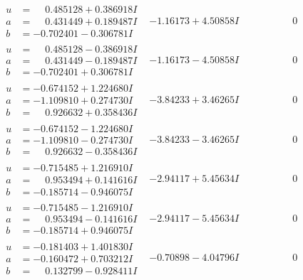 \documentclass[1p]{elsarticle_modified}
\theoremstyle{definition}
\begin{document}
$$\begin{array}{c|c|c}
\begin{aligned}
u &= \phantom{-}0.485128 + 0.386918 I \\
a &= \phantom{-}0.431449 + 0.189487 I \\
b &= -0.702401 - 0.306781 I\end{aligned}
 & -1.16173 + 4.50858 I & \phantom{-0.000000 } 0 \\ \hline\begin{aligned}
u &= \phantom{-}0.485128 - 0.386918 I \\
a &= \phantom{-}0.431449 - 0.189487 I \\
b &= -0.702401 + 0.306781 I\end{aligned}
 & -1.16173 - 4.50858 I & \phantom{-0.000000 } 0 \\ \hline\begin{aligned}
u &= -0.674152 + 1.224680 I \\
a &= -1.109810 + 0.274730 I \\
b &= \phantom{-}0.926632 + 0.358436 I\end{aligned}
 & -3.84233 + 3.46265 I & \phantom{-0.000000 } 0 \\ \hline\begin{aligned}
u &= -0.674152 - 1.224680 I \\
a &= -1.109810 - 0.274730 I \\
b &= \phantom{-}0.926632 - 0.358436 I\end{aligned}
 & -3.84233 - 3.46265 I & \phantom{-0.000000 } 0 \\ \hline\begin{aligned}
u &= -0.715485 + 1.216910 I \\
a &= \phantom{-}0.953494 + 0.141616 I \\
b &= -0.185714 - 0.946075 I\end{aligned}
 & -2.94117 + 5.45634 I & \phantom{-0.000000 } 0 \\ \hline\begin{aligned}
u &= -0.715485 - 1.216910 I \\
a &= \phantom{-}0.953494 - 0.141616 I \\
b &= -0.185714 + 0.946075 I\end{aligned}
 & -2.94117 - 5.45634 I & \phantom{-0.000000 } 0 \\ \hline\begin{aligned}
u &= -0.181403 + 1.401830 I \\
a &= -0.160472 + 0.703212 I \\
b &= \phantom{-}0.132799 - 0.928411 I\end{aligned}
 & -0.70898 - 4.04796 I & \phantom{-0.000000 } 0 \\ \hline\begin{aligned}

\end{aligned}
\end{array}$$
\end{document}
